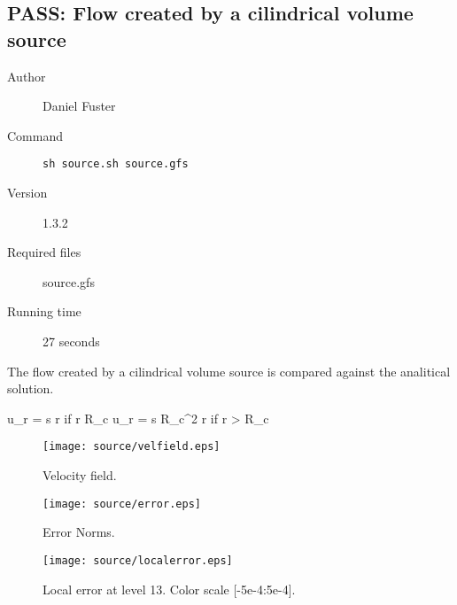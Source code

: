 \subsection{\label{source}{\color{OliveGreen}PASS}:
Flow created by a cilindrical volume source
}
\begin{description}
\item[Author]Daniel Fuster
\item[Command]{\tt sh source.sh source.gfs}
\item[Version]1.3.2
\item[Required files] source.gfs  \\   
\item[Running time] 27 seconds
\end{description}

The flow created by a cilindrical volume source is compared
against the analitical solution.

u_r = { s r  } \; \; if \; \; r \le R_c
u_r = { s R_c^2  r} \; \; if \; \; r > R_c

\begin{figure}[htbp]
\caption{\label{Velocity Norm} Velocity field.}
\begin{center}
\texttt{[image: source/velfield.eps]}
\end{center}
\end{figure}

\begin{figure}[htbp]
\caption{\label{Error Norms} Error Norms.}
\begin{center}
\texttt{[image: source/error.eps]}
\end{center}
\end{figure}

\begin{figure}[htbp]
\caption{\label{Relative Local Error} Local error at level 13. Color scale [-5e-4:5e-4].}
\begin{center}
\texttt{[image: source/localerror.eps]}
\end{center}
\end{figure}
